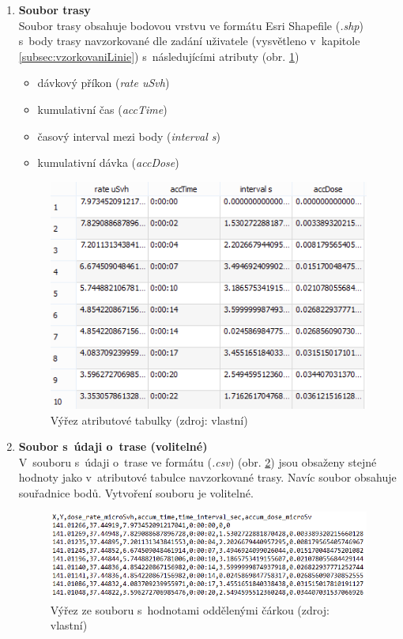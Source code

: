 \begin{enumerate}
	\item \textbf{Soubor trasy} \\ Soubor trasy obsahuje bodovou
vrstvu ve formátu Esri Shapefile (\textit{.shp}) s~body trasy
navzorkované dle zadání uživatele (vysvětleno v~kapitole
\ref{subsec:vzorkovaniLinie}) s~následujícími atributy (obr. \ref{fig:atributova_tabulka})
		\begin{itemize}
			\item dávkový příkon (\textit{rate uSvh})
			\item kumulativní čas (\textit{accTime})
			\item časový interval mezi body (\textit{interval s})
			\item kumulativní dávka (\textit{accDose})
		\end{itemize}
			\begin{figure}[H] \centering
      			\includegraphics[scale=1]{./pictures/atributova_tabulka.png}
      				\caption[Výřez atributové
tabulky]{Výřez atributové tabulky (zdroj: vlastní)}
     				\label{fig:atributova_tabulka}
  			\end{figure}
  	
  	\item \textbf{Soubor s~údaji o~trase (volitelné)} \\ V~souboru
s~údaji o~trase ve formátu  (\textit{.csv}) (obr. \ref{fig:csv}) jsou obsaženy
stejné hodnoty jako v~atributové tabulce navzorkované trasy. Navíc
soubor obsahuje souřadnice bodů. Vytvoření souboru je volitelné.
  			\begin{figure}[H] \centering
      			\includegraphics[scale=0.8]{./pictures/csv.png}
      				\caption[Výřez ze souboru s~hodnotami
oddělenými čárkou]{Výřez ze souboru s~hodnotami oddělenými čárkou
(zdroj: vlastní)}
     				\label{fig:csv}
  			\end{figure}
\end{enumerate}

